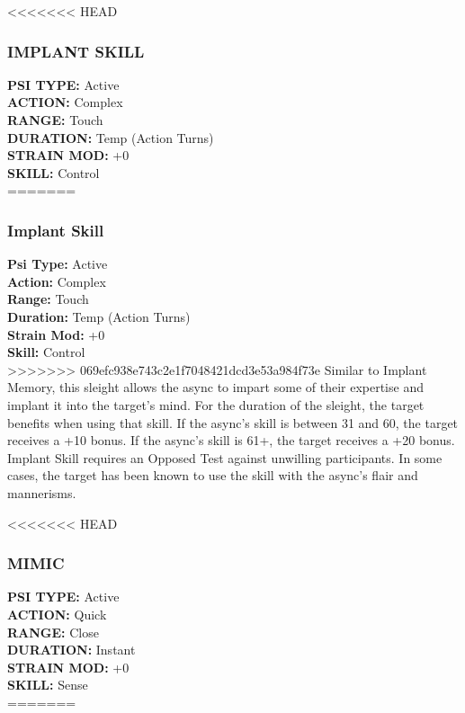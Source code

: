<<<<<<< HEAD
\subsubsection{IMPLANT SKILL}
\textbf{PSI TYPE:} Active \\ 
\textbf{ACTION:} Complex \\ 
\textbf{RANGE:} Touch \\ 
\textbf{DURATION:} Temp (Action Turns) \\
\textbf{STRAIN MOD:} +0 \\ 
\textbf{SKILL:} Control\\
=======
\subsubsection{Implant Skill}
\textbf{Psi Type:} Active \\ 
\textbf{Action:} Complex \\ 
\textbf{Range:} Touch \\ 
\textbf{Duration:} Temp (Action Turns) \\
\textbf{Strain Mod:} +0 \\ 
\textbf{Skill:} Control\\
>>>>>>> 069efc938e743c2e1f7048421dcd3e53a984f73e
Similar to Implant Memory, this sleight allows the
async to impart some of their expertise and implant it
into the target’s mind. For the duration of the sleight,
the target benefits when using that skill. If the async’s
skill is between 31 and 60, the target receives a +10
bonus. If the async’s skill is 61+, the target receives
a +20 bonus. Implant Skill requires an Opposed Test
against unwilling participants. In some cases, the
target has been known to use the skill with the async’s
flair and mannerisms.

<<<<<<< HEAD
\subsubsection{MIMIC}
\textbf{PSI TYPE:} Active \\ 
\textbf{ACTION:} Quick \\ 
\textbf{RANGE:} Close \\ 
\textbf{DURATION:} Instant \\
\textbf{STRAIN MOD:} +0 \\ 
\textbf{SKILL:} Sense\\
=======
